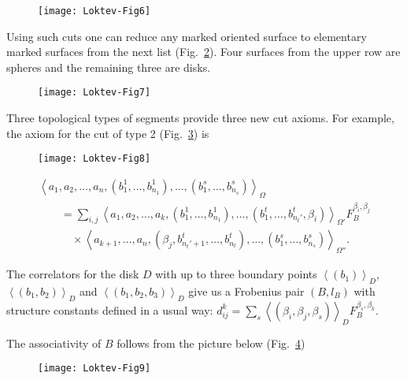 \documentclass[pdftex]{sigma}
\def \lc {\left<}
\def \rc {\right>}
\begin{document}
\begin{figure}[tbph]
\centering
\texttt{[image: Loktev-Fig6]}
\caption{}\label{f6}
\end{figure}

Using such cuts one can reduce any marked oriented
surface to elementary marked surfaces from the next list (Fig.~\ref{f7}).
Four surfaces from the upper row are spheres and the remaining three are disks.


\begin{figure}[tbph]
\centering
\texttt{[image: Loktev-Fig7]}
\caption{}\label{f7}
\end{figure}


Three topological types of segments provide three  new cut axioms.
For example, the axiom for the cut of type 2 (Fig.~\ref{f8}) is

\begin{figure}[tbph]
\centering
\texttt{[image: Loktev-Fig8]}
\caption{}\label{f8}
\end{figure}

\vspace*{-6mm}

\begin{gather*}
\lc a_1,a_2,\dots ,a_n, (b^1_1,\dots,b^1_{n_1}),  \dots,
(b^s_1,\dots,b^s_{n_s}) \rc_{\Omega}\\
\qquad{} =\sum_{i,j}
\lc a_1,a_2,\dots,a_k, (b^1_1,\dots,b^1_{n_1}), \dots,
(b^t_1,\dots,b^t_{n_t'},\beta_i) \rc_{\Omega'} F^{\beta_i,\beta_j}_B\\
\qquad\quad{}\times
\lc a_{k+1},\dots,a_n, (\beta_j,b^t_{n_t'+1},\dots,b^t_{n_t}), \dots,
(b^s_1,\dots,b^s_{n_s}) \rc_{\Omega''}.
\end{gather*}





The correlators for the  disk $D$ with up to three  boundary points $\lc (b_1) \rc_D$,
$\lc (b_1,b_2) \rc_D$ and $\lc (b_1,b_2,b_3)\rc_D$ give us  a  Frobenius
pair $(B,l_B)$ with structure constants def\/ined in a usual way:
$d_{ij}^{k}=\sum_{s} \left< (\beta_i,\beta_j,\beta_s) \right>_{D} F^{\beta_s,\beta_k}_B$.


The associativity of $B$ follows from the picture below (Fig.~\ref{f9})

\begin{figure}[tbph]
\centering
\texttt{[image: Loktev-Fig9]}
\caption{}\label{f9}
\end{figure}
\end{document}
